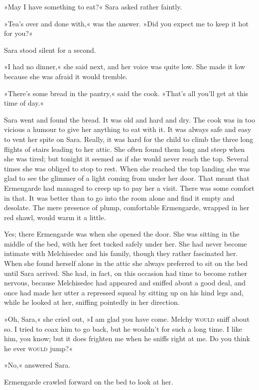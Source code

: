 »May I have something to eat?« Sara asked rather faintly.

»Tea's over and done with,« was the answer. »Did you expect me to keep it hot for you?«

Sara stood silent for a second.

»I had no dinner,« she said next, and her voice was quite low. She made it low because she was afraid it would tremble.

»There's some bread in the pantry,« said the cook. »That's all you'll get at this time of day.«

Sara went and found the bread. It was old and hard and dry. The cook was in too vicious a humour to give her anything to eat with it. It was always safe and easy to vent her spite on Sara. Really, it was hard for the child to climb the three long flights of stairs leading to her attic. She often found them long and steep when she was tired; but tonight it seemed as if she would never reach the top. Several times she was obliged to stop to rest. When she reached the top landing she was glad to see the glimmer of a light coming from under her door. That meant that Ermengarde had managed to creep up to pay her a visit. There was some comfort in that. It was better than to go into the room alone and find it empty and desolate. The mere presence of plump, comfortable Ermengarde, wrapped in her red shawl, would warm it a little.

Yes; there Ermengarde was when she opened the door. She was sitting in the middle of the bed, with her feet tucked safely under her. She had never become intimate with Melchisedec and his family, though they rather fascinated her. When she found herself alone in the attic she always preferred to sit on the bed until Sara arrived. She had, in fact, on this occasion had time to become rather nervous, because Melchisedec had appeared and sniffed about a good deal, and once had made her utter a repressed squeal by sitting up on his hind legs and, while he looked at her, sniffing pointedly in her direction.

»Oh, Sara,« she cried out, »I am glad you have come. Melchy \textsc{would} sniff about so. I tried to coax him to go back, but he wouldn't for such a long time. I like him, you know; but it does frighten me when he sniffs right at me. Do you think he ever \textsc{would} jump?«

»No,« answered Sara.

Ermengarde crawled forward on the bed to look at her.

